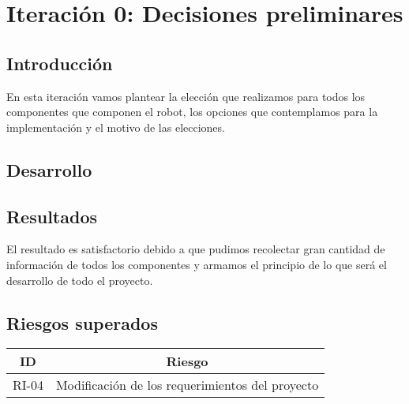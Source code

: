 \newpage
\section{Iteración 0: Decisiones preliminares}
\subsection{Introducción}
En esta iteración vamos plantear la elección que realizamos para todos los componentes que componen el robot, los opciones que contemplamos para la implementación y el motivo de las elecciones.



\subsection{Desarrollo}

















\subsection{Resultados}
El resultado es satisfactorio debido a que pudimos recolectar gran cantidad de información de todos los componentes y armamos el principio de lo que será el desarrollo de todo el proyecto.

\subsection{Riesgos superados}
\begin{center}
    \begin{tabular} {
        | c| c |}
        \hline \rowcolor{test_header_color}
            ID & Riesgo \\
        \hline
            RI-04 & Modificación de los requerimientos del proyecto\\
        \hline
    \end{tabular}
\end{center}

